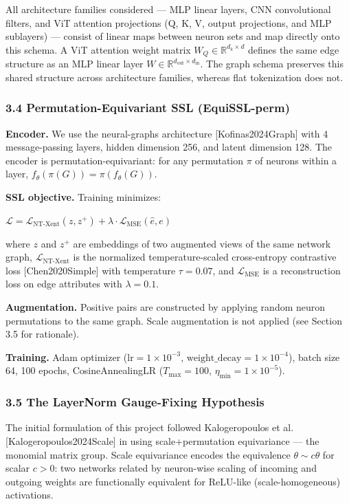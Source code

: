 All architecture families considered --- MLP linear layers, CNN convolutional filters, and ViT attention projections (Q, K, V, output projections, and MLP sublayers) --- consist of linear maps between neuron sets and map directly onto this schema. A ViT attention weight matrix $W_Q \in \mathbb{R}^{d_k \times d}$ defines the same edge structure as an MLP linear layer $W \in \mathbb{R}^{d_\text{out} \times d_\text{in}}$. The graph schema preserves this shared structure across architecture families, whereas flat tokenization does not.

\subsubsection{3.4 Permutation-Equivariant SSL (EquiSSL-perm)}

\textbf{Encoder.} We use the neural-graphs architecture [Kofinas2024Graph] with 4 message-passing layers, hidden dimension 256, and latent dimension 128. The encoder is permutation-equivariant: for any permutation $\pi$ of neurons within a layer, $f_\theta(\pi(G)) = \pi(f_\theta(G))$.

\textbf{SSL objective.} Training minimizes:

$\mathcal{L} = \mathcal{L}_\text{NT-Xent}(z, z^+) + \lambda \cdot \mathcal{L}_\text{MSE}(\hat{e}, e)$

where $z$ and $z^+$ are embeddings of two augmented views of the same network graph, $\mathcal{L}_\text{NT-Xent}$ is the normalized temperature-scaled cross-entropy contrastive loss [Chen2020Simple] with temperature $\tau=0.07$, and $\mathcal{L}_\text{MSE}$ is a reconstruction loss on edge attributes with $\lambda=0.1$.

\textbf{Augmentation.} Positive pairs are constructed by applying random neuron permutations to the same graph. Scale augmentation is not applied (see Section 3.5 for rationale).

\textbf{Training.} Adam optimizer ($\text{lr}=1\times 10^{-3}$, $\text{weight\_decay}=1\times 10^{-4}$), batch size 64, 100 epochs, CosineAnnealingLR ($T_\text{max}=100$, $\eta_{\min}=1\times 10^{-5}$).

\subsubsection{3.5 The LayerNorm Gauge-Fixing Hypothesis}

The initial formulation of this project followed Kalogeropoulos et al. [Kalogeropoulos2024Scale] in using scale+permutation equivariance --- the monomial matrix group. Scale equivariance encodes the equivalence $\theta \sim c\theta$ for scalar $c > 0$: two networks related by neuron-wise scaling of incoming and outgoing weights are functionally equivalent for ReLU-like (scale-homogeneous) activations.

